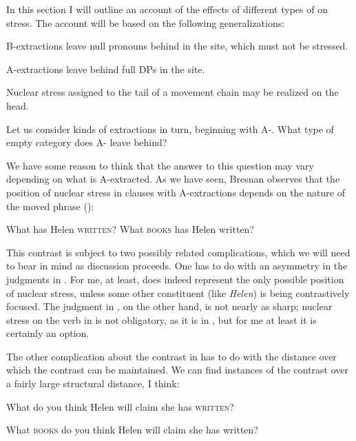 \documentclass[output=paper]{LSP/langsci}
\begin{document}
In this section I will outline an account of the effects of different types of  on stress.  The account will be based on the following generalizations:

\ea%
    \label{ex:richards:33}
    
\ea B-extractions leave null pronouns behind in the  site, which must not be     stressed.

\ex A-extractions leave behind full DPs in the  site.

\ex Nuclear stress assigned to the tail of a movement chain may be realized on the head.  
\z
\z

Let us consider kinds of extractions in turn, beginning with A-.  What type of empty category does A- leave behind?

  We have some reason to think that the answer to this {question} may vary depending on what is A-extracted.  As we have seen, Bresnan observes that the position of nuclear stress in clauses with A-extractions depends on the nature of the moved phrase (\citealt[259]{Bresnan1971}):


\ea%
    \label{ex:richards:36}
\ea\label{ex:richards:36a} What has Helen \textsc{written}?
\ex\label{ex:richards:36b} What \textsc{books} has Helen written?
\z
\z

This contrast is subject to two possibly related complications, which we will need to bear in mind as discussion proceeds.  One has to do with an asymmetry in the judgments in .  For me, at least,  does indeed represent the only possible position of nuclear stress, unless some other constituent (like \textit{Helen}) is being contrastively focused.  The judgment in , on the other hand, is not nearly as sharp; nuclear stress on the verb in  is not obligatory, as it is in , but for me at least it is certainly an option.

  The other complication about the contrast in  has to do with the distance over which the contrast can be maintained.  We can find instances of the contrast over a fairly large structural distance, I think:


\ea%
    \label{ex:richards:37}
    
\ea What do you think Helen will claim she has \textsc{written}?

\ex What \textsc{books} do you think Helen will claim she has written?
\z
\z
\end{document}
